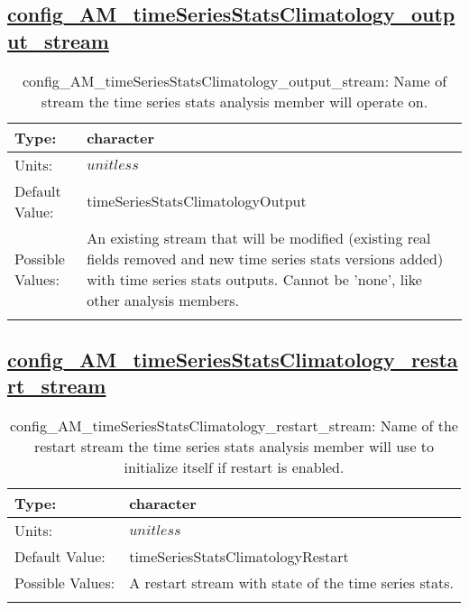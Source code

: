 \subsection[config\_AM\_timeSeriesStatsClimatology\_output\_stream]{\hyperref[sec:nm_tab_AM_timeSeriesStatsClimatology]{config\_AM\_timeSeriesStatsClimatology\_output\_stream}}
\label{subsec:nm_sec_config_AM_timeSeriesStatsClimatology_output_stream}
\begin{center}
\begin{longtable}{| p{2.0in} || p{4.0in} |}
    \hline
    Type: & character \\
    \hline
    Units: & $unitless$ \\
    \hline
    Default Value: & timeSeriesStatsClimatologyOutput \\
    \hline
    Possible Values: & An existing stream that will be modified (existing real fields removed and new time series stats versions added) with time series stats outputs. Cannot be 'none', like other analysis members. \\
    \hline
    \caption{config\_AM\_timeSeriesStatsClimatology\_output\_stream: Name of stream the time series stats analysis member will operate on.}
\end{longtable}
\end{center}
\subsection[config\_AM\_timeSeriesStatsClimatology\_restart\_stream]{\hyperref[sec:nm_tab_AM_timeSeriesStatsClimatology]{config\_AM\_timeSeriesStatsClimatology\_restart\_stream}}
\label{subsec:nm_sec_config_AM_timeSeriesStatsClimatology_restart_stream}
\begin{center}
\begin{longtable}{| p{2.0in} || p{4.0in} |}
    \hline
    Type: & character \\
    \hline
    Units: & $unitless$ \\
    \hline
    Default Value: & timeSeriesStatsClimatologyRestart \\
    \hline
    Possible Values: & A restart stream with state of the time series stats. \\
    \hline
    \caption{config\_AM\_timeSeriesStatsClimatology\_restart\_stream: Name of the restart stream the time series stats analysis member will use to initialize itself if restart is enabled.}
\end{longtable}
\end{center}
